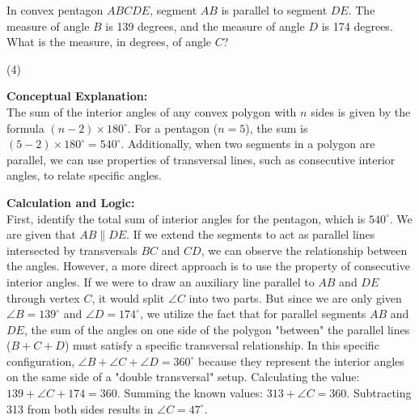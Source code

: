 \documentclass[11pt,paper=a4,answers]{exam}
\begin{document}
\begin{questions}
\pointsinrightmargin
\pointsdroppedatright
\marksnotpoints
{}
\pointformat{\boldmath\themarginpoints}
\bracketedpoints


\question
In convex pentagon $ABCDE$, segment $AB$ is parallel to segment $DE$. The measure of angle $B$ is 139 degrees, and the measure of angle $D$ is 174 degrees. What is the measure, in degrees, of angle $C$?
\begin{tasks}(4)
\end{tasks}

\begin{solution}
\textbf{Conceptual Explanation:} \\
The sum of the interior angles of any convex polygon with $n$ sides is given by the formula $(n - 2) \times 180^\circ$. For a pentagon ($n = 5$), the sum is $(5 - 2) \times 180^\circ = 540^\circ$. Additionally, when two segments in a polygon are parallel, we can use properties of transversal lines, such as consecutive interior angles, to relate specific angles.

\vspace{30pt}

\textbf{Calculation and Logic:} \\
First, identify the total sum of interior angles for the pentagon, which is $540^\circ$. We are given that $AB \parallel DE$. If we extend the segments to act as parallel lines intersected by transversals $BC$ and $CD$, we can observe the relationship between the angles. However, a more direct approach is to use the property of consecutive interior angles. If we were to draw an auxiliary line parallel to $AB$ and $DE$ through vertex $C$, it would split $\angle C$ into two parts. But since we are only given $\angle B = 139^\circ$ and $\angle D = 174^\circ$, we utilize the fact that for parallel segments $AB$ and $DE$, the sum of the angles on one side of the polygon "between" the parallel lines ($B + C + D$) must satisfy a specific transversal relationship. In this specific configuration, $\angle B + \angle C + \angle D = 360^\circ$ because they represent the interior angles on the same side of a "double transversal" setup. Calculating the value: $139 + \angle C + 174 = 360$. Summing the known values: $313 + \angle C = 360$. Subtracting 313 from both sides results in $\angle C = 47^\circ$.


\end{solution}
\end{questions}
\end{document}
